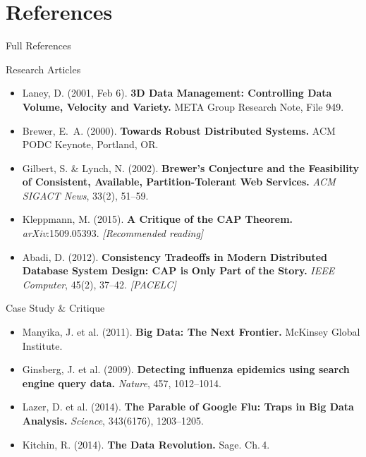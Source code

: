 \documentclass[aspectratio=169,10pt]{beamer}
\begin{document}
\section*{References}

\begin{frame}{Full References}
  \begin{block}{Research Articles}
    \begin{itemize}
      \small
      \item Laney, D. (2001, Feb 6). \textbf{3D Data Management: Controlling Data Volume, Velocity and Variety.} META Group Research Note, File 949.
      \item Brewer, E.\ A. (2000). \textbf{Towards Robust Distributed Systems.} ACM PODC Keynote, Portland, OR.
      \item Gilbert, S. \& Lynch, N. (2002). \textbf{Brewer's Conjecture and the Feasibility of Consistent, Available, Partition-Tolerant Web Services.} \textit{ACM SIGACT News}, 33(2), 51--59.
      \item Kleppmann, M. (2015). \textbf{A Critique of the CAP Theorem.} \textit{arXiv}:1509.05393. \textit{[Recommended reading]}
      \item Abadi, D. (2012). \textbf{Consistency Tradeoffs in Modern Distributed Database System Design: CAP is Only Part of the Story.} \textit{IEEE Computer}, 45(2), 37--42. \textit{[PACELC]}
    \end{itemize}
  \end{block}
  \vspace{4pt}
  \begin{exampleblock}{Case Study \& Critique}
    \begin{itemize}
      \small
      \item Manyika, J. et al. (2011). \textbf{Big Data: The Next Frontier.} McKinsey Global Institute.
      \item Ginsberg, J. et al. (2009). \textbf{Detecting influenza epidemics using search engine query data.} \textit{Nature}, 457, 1012--1014.
      \item Lazer, D. et al. (2014). \textbf{The Parable of Google Flu: Traps in Big Data Analysis.} \textit{Science}, 343(6176), 1203--1205.
      \item Kitchin, R. (2014). \textbf{The Data Revolution.} Sage. Ch.\,4.
    \end{itemize}
  \end{exampleblock}
\end{frame}
\end{document}
